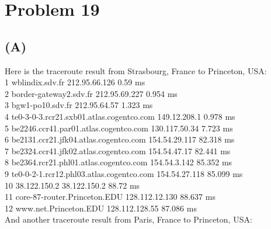 \documentclass[titlepage, paper=a4, fontsize=11pt]{scrartcl} %
\numberwithin{equation}{section} %
\numberwithin{figure}{section} %
\numberwithin{table}{section} %
\begin{document}

\section*{Problem 19}
\subsection*{(A)}
Here is the traceroute result from Strasbourg, France to Princeton, USA: \\

1	wblindix.sdv.fr      	212.95.66.126      	0.59 ms \\
2	border-gateway2.sdv.fr      	212.95.69.227      	0.954 ms \\
3	bgw1-po10.sdv.fr      	212.95.64.57      	1.323 ms \\
4	te0-3-0-3.rcr21.sxb01.atlas.cogentco.com      	149.12.208.1      	0.978 ms \\
5	be2246.ccr41.par01.atlas.cogentco.com      	130.117.50.34      	7.723 ms \\
6	be2131.ccr21.jfk04.atlas.cogentco.com      	154.54.29.117      	82.318 ms \\
7	be2324.ccr41.jfk02.atlas.cogentco.com      	154.54.47.17      	82.441 ms \\
8	be2364.rcr21.phl01.atlas.cogentco.com      	154.54.3.142      	85.352 ms \\
9	te0-0-2-1.rcr12.phl03.atlas.cogentco.com      	154.54.27.118      	85.099 ms \\
10	38.122.150.2      	38.122.150.2      	88.72 ms \\
11	core-87-router.Princeton.EDU      	128.112.12.130      	88.637 ms \\
12	www.net.Princeton.EDU      	128.112.128.55      	87.086 ms
\\

And another traceroute result from Paris, France to Princeton, USA: \\
\end{document}
